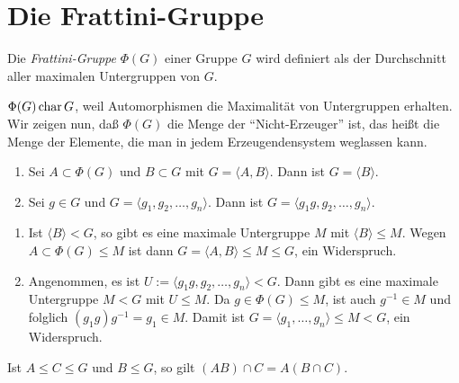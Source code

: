 \section{Die Frattini-Gruppe}

\begin{definition} 
 Die \emph{Frattini-Gruppe} $\Phi(G)$ einer Gruppe $G$ wird definiert als der Durchschnitt aller maximalen Untergruppen von $G$.
\end{definition}

\begin{bemerkung*}
 $\Phi(G)\operatorname{char} G$, weil Automorphismen die Maximalit\"at von Untergruppen erhalten. Wir zeigen nun, da\ss{} $\Phi(G)$ die Menge der ``Nicht-Erzeuger'' ist, das hei\ss{}t die Menge der Elemente, die man in jedem Erzeugendensystem weglassen kann.
\end{bemerkung*}

\begin{lemma}\spspace \label{9.2}
 \begin{enumerate}
 \item Sei $A\subset \Phi(G)$ und $B\subset G$ mit $G=\langle A, B \rangle$. Dann ist $G=\langle B\rangle$.
 \item Sei $g\in G$ und $G=\langle g_1, g_2,\ldots , g_n\rangle$. Dann ist $G=\langle g_1g, g_2, \ldots , g_n\rangle$.
\end{enumerate}

\end{lemma}

\begin{beweis}\spspace
 \begin{enumerate}
 \item Ist $\langle B\rangle < G$, so gibt es eine maximale Untergruppe $M$ mit $\langle B\rangle\leq M$. Wegen $A\subset \Phi(G)\leq M$ ist dann $G=\langle A, B\rangle \leq M\leq G$, ein Widerspruch.
 \item Angenommen, es ist $U:=\langle g_1g, g_2, \ldots , g_n\rangle < G$. Dann gibt es eine maximale Untergruppe $M < G$ mit $U\leq M$. Da $g\in \Phi(G)\leq M$, ist auch $g^{-1}\in M$ und folglich $(g_1g)g^{-1}=g_1\in M$. Damit ist $G=\langle g_1, \ldots , g_n\rangle\leq M < G$, ein Widerspruch.
\end{enumerate}

 
\end{beweis}

\begin{lemma} \label{9.3}
 Ist $A\leq C\leq G$ und $B\leq G$, so gilt $(AB)\cap C=A(B\cap C)$.
\end{lemma}

